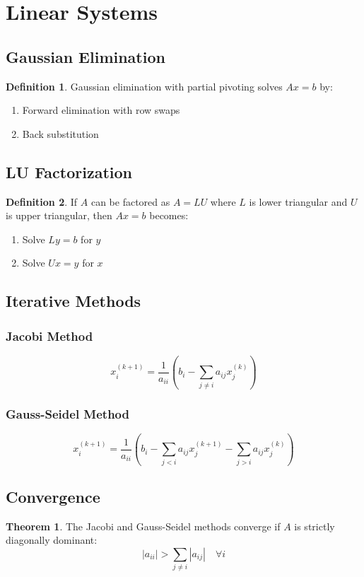 \documentclass[11pt]{article}
\theoremstyle{definition}
\newtheorem{definition}{Definition}[section]
\newtheorem{theorem}{Theorem}[section]
\begin{document}
\section{Linear Systems}

\subsection{Gaussian Elimination}
\begin{definition}
Gaussian elimination with partial pivoting solves $Ax = b$ by:
\begin{enumerate}
    \item Forward elimination with row swaps
    \item Back substitution
\end{enumerate}
\end{definition}

\subsection{LU Factorization}
\begin{definition}
If $A$ can be factored as $A = LU$ where $L$ is lower triangular and $U$ is upper triangular, then $Ax = b$ becomes:
\begin{enumerate}
    \item Solve $Ly = b$ for $y$
    \item Solve $Ux = y$ for $x$
\end{enumerate}
\end{definition}

\subsection{Iterative Methods}

\subsubsection{Jacobi Method}
$$x_i^{(k+1)} = \frac{1}{a_{ii}} \left(b_i - \sum_{j \neq i} a_{ij} x_j^{(k)}\right)$$

\subsubsection{Gauss-Seidel Method}
$$x_i^{(k+1)} = \frac{1}{a_{ii}} \left(b_i - \sum_{j<i} a_{ij} x_j^{(k+1)} - \sum_{j>i} a_{ij} x_j^{(k)}\right)$$

\subsection{Convergence}
\begin{theorem}
The Jacobi and Gauss-Seidel methods converge if $A$ is strictly diagonally dominant:
$$|a_{ii}| > \sum_{j \neq i} |a_{ij}| \quad \forall i$$
\end{theorem}
\end{document}
